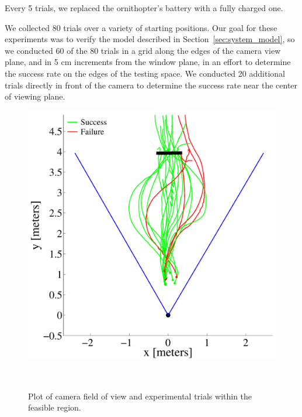 \documentclass{aamas2013}
\begin{document}
Every 5 trials, we replaced the ornithopter's battery with a fully 
charged one.

We collected 80 trials over a variety of starting positions. Our 
goal for these experiments was to verify the model described in 
Section~\ref{sec:system_model}, so we conducted 60 of the 80 trials in a 
grid along the edges of the camera view plane, and in 5 cm increments 
from the window plane, in an effort to determine the success rate on the edges of 
the testing space. We conducted 20 additional trials directly in front of 
the camera to determine the success rate near the center of viewing plane.

\begin{figure}[tb]
\begin{minipage}[b]{0.45\linewidth}
\centering
\includegraphics[width=\linewidth]{figures/flight_paths_feasible.pdf}
\caption{Plot of camera field of view and experimental trials within the feasible region.}
\label{fig:flight_paths_feasible}\
\end{minipage}
\hfill
\begin{minipage}[b]{0.45\linewidth}
\centering

\end{minipage}
\end{figure}
\end{document}
